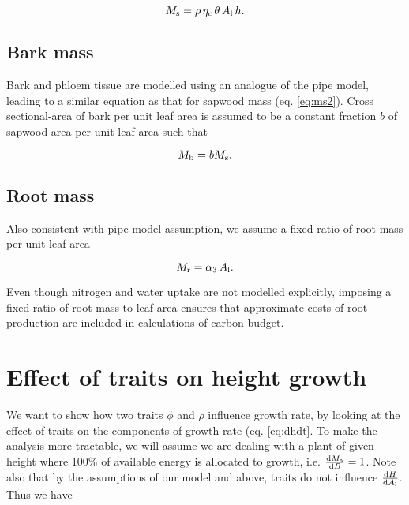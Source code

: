 \documentclass[a4paper,11pt]{article}
\begin{document}
\begin{appendices}
\begin{equation}\label{eq:ms2}
M_\textrm{s}=\rho \, \eta_c \, \theta \, A_{\rm l} \, h.
\end{equation}

\subsection{Bark mass}\label{bark-mass}

Bark and phloem tissue are modelled using an analogue of the pipe model,
leading to a similar equation as that for sapwood mass (eq.
\ref{eq:ms2}). Cross sectional-area of bark per unit leaf area is
assumed to be a constant fraction $b$ of sapwood area per unit leaf
area such that

\begin{equation}\label{eq:mb}
M_{\rm b}=b M_\textrm{s}.
\end{equation}

\subsection{Root mass}\label{root-mass}

Also consistent with pipe-model assumption, we assume a fixed ratio of
root mass per unit leaf area

\begin{equation}\label{eq:mr}
M_{\rm r}=\alpha_3 \, A_{\rm l}.
\end{equation}

Even though nitrogen and water uptake are not modelled explicitly,
imposing a fixed ratio of root mass to leaf area ensures that
approximate costs of root production are included in calculations of
carbon budget.

\section{Effect of traits on height growth} \label{app:traits_max}

We want to show how two traits $\phi$ and $\rho$ influence growth rate,
by looking at the effect of
traits on the components of growth rate (eq. \ref{eq:dhdt}. To make
the analysis more tractable, we will assume we are dealing with a plant of
given height where 100\% of available energy is allocated to growth,
i.e. $\frac{{\rm d}M_{\rm a}}{{\rm d}B}=1$. Note also
that by the assumptions of our model and above, traits do not influence
$\frac{{\rm d}H} {{\rm d}A_{\rm l}}$. Thus we have


\end{appendices}
\end{document}
